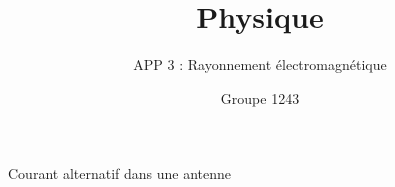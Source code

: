 \documentclass[pdf]{beamer}
\title{Physique}
\subtitle{APP 3 : Rayonnement électromagnétique}
\author{Groupe 1243}
\begin{document}
 
 
\begin{frame} 
	\titlepage 
\end{frame}

\begin{frame}{Courant alternatif dans une antenne}

\end{frame} 
 
\end{document}
